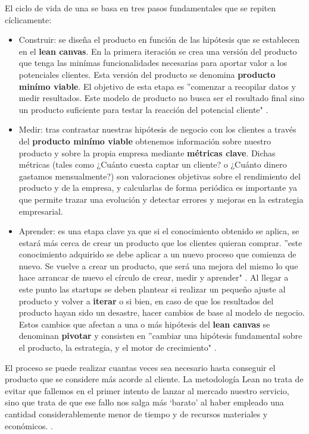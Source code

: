 El ciclo de vida de una  se basa en tres pasos fundamentales que se repiten cíclicamente:
\begin{itemize}
	\item Construir: se diseña el producto en función de las hipótesis que se establecen en el \textbf{lean canvas}. En la primera iteración se crea una versión del producto que tenga las minímas funcionalidades necesarias para aportar valor a los potenciales clientes. Esta versión del producto se denomina \textbf{producto minímo viable}. El objetivo de esta etapa es ''comenzar a recopilar datos y medir resultados. Este modelo de producto no busca ser el resultado final sino un producto suficiente para testar la reacción del potencial cliente" \cite{antevenio2016}.
	\item Medir: tras contrastar nuestras hipótesis de negocio con los clientes a través del \textbf{producto minímo viable} obtenemos información sobre nuestro producto y sobre la propia empresa mediante \textbf{métricas clave}. Dichas métricas (tales como ¿Cuánto cuesta captar un cliente? o ¿Cuánto dinero gastamos mensualmente?) son valoraciones objetivas sobre el rendimiento del producto y de la empresa, y calcularlas de forma periódica es importante ya que permite trazar una evolución y detectar errores y mejoras en la estrategia empresarial.
	\item Aprender: es una etapa clave ya que si el conocimiento obtenido se aplica, se estará más cerca de crear un producto que los clientes quieran comprar. ''este conocimiento adquirido se debe aplicar a un nuevo proceso que comienza de nuevo. Se vuelve a crear un producto, que será una mejora del mismo lo que hace arrancar de nuevo el círculo de crear, medir y aprender" \cite{antevenio2016}. Al llegar a este punto las startups se deben plantear si realizar un pequeño ajuste al producto y volver a \textbf{iterar} o si bien, en caso de que los resultados del producto hayan sido un desastre, hacer cambios de base al modelo de negocio. Estos cambios que afectan a una o más hipótesis del \textbf{lean canvas} se denominan \textbf{pivotar} y consisten en ''cambiar una hipótesis fundamental sobre el producto, la estrategia, y el motor de crecimiento" \cite{emooc}.
\end{itemize}

El proceso se puede realizar cuantas veces sea necesario hasta conseguir el producto que se considere más acorde al cliente. La metodología Lean  no trata de evitar que fallemos en el primer intento de lanzar al mercado nuestro servicio, sino que trata de que ese fallo nos salga más ‘barato’ al haber empleado una cantidad considerablemente menor de tiempo y de recursos materiales y económicos. \cite{andreapelaez} .

